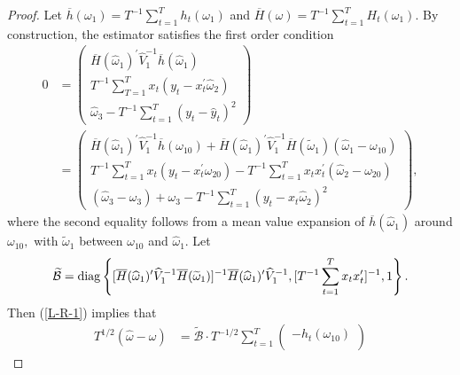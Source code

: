 \documentclass[11pt, letterpaper, twoside]{article}
\begin{document}
\begin{appendices}
\begin{proof}
Let $\overline{h}(\omega _{1})=T^{-1}\sum_{t=1}^{T}h_{t}(\omega _{1})$ and $ \overline{H}(\omega )=T^{-1}\sum_{t=1}^{T}H_{t}(\omega _{1}).$ By construction, the estimator satisfies the first order condition
%
\begin{align}
    0 &= 
    \begin{pmatrix} 
        \overline{H}(\widehat{\omega }_{1})^{\prime }\widehat{V}_{1}^{-1}\overline{h} (\widehat{\omega }_{1}) \\ 
%
        T^{-1}\sum_{T=1}^{T}x_{t}(y_{t}-x_{t}^{\prime }\widehat{\omega }_{2}) \\ 
%
        \widehat{\omega }_{3}-T^{-1}\sum_{t=1}^{T}\left( y_{t}-\widehat{y} _{t}\right) ^{2} 
    \end{pmatrix} \nonumber \\ 
%
    &= 
%
    \begin{pmatrix}
%
        \overline{H}(\widehat{\omega }_{1})^{\prime }\widehat{V}_{1}^{-1}\overline{h} (\omega _{10})+\overline{H}(\widehat{\omega }_{1})^{\prime }\widehat{V} _{1}^{-1}\overline{H}(\widetilde{\omega }_{1})(\widehat{\omega }_{1}-\omega
_{10}) \\ 
%
        T^{-1}\sum_{t=1}^{T}x_{t}(y_{t}-x_{t}^{\prime }\omega _{20})-T^{-1}\sum_{t=1}^{T}x_{t}x_{t}^{\prime }\left( \widehat{\omega } _{2}-\omega _{20}\right) \\ 
%
        \left( \widehat{\omega }_{3}-\omega _{3}\right) +\omega _{3}-T^{-1}\sum_{t=1}^{T}\left( y_{t}-x_{t}\widehat{\omega }_{2}\right) ^{2}
    \end{pmatrix},
%
  \label{L-R-1}
\end{align}
%
where the second equality follows from a mean value expansion of $\overline{h }(\widehat{\omega }_{1})$ around $\omega _{10},$ with $\widetilde{\omega } _{1}$ between $\omega _{10}$ and $\widehat{\omega }_{1}$. 
Let
%
\begin{equation}
%
    \widetilde{\mathcal{B}} = \diag\left\lbrace[\overline{H}(\widehat{\omega }_{1})^{\prime } \widehat{V}_{1}^{-1}\overline{H}(\widetilde{\omega }_{1})]^{-1}\overline{H}( \widehat{\omega }_{1})^{\prime }\widehat{V}_{1}^{-1},[T^{-1} \sum_{t=1}^{T}x_{t}x_{t}^{\prime }]^{-1},1\right\rbrace.  
%
\end{equation}
%
Then (\ref{L-R-1}) implies that 
%
\begin{align}
    T^{1/2}\left( \widehat{\omega }-\omega \right) 
%    
    &= \widetilde{\mathcal{B}} \cdot T^{-1/2}\sum_{t=1}^{T} 
%
    \begin{pmatrix}
        -h_{t}(\omega _{10}) \\ 

\end{pmatrix}
\end{align}
\end{proof}
\end{appendices}
\end{document}
